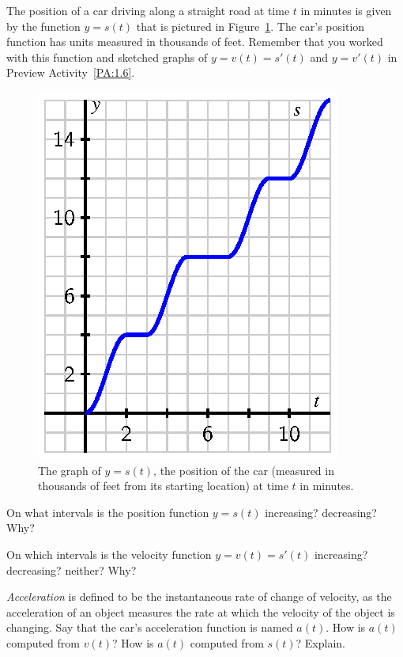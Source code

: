 \begin{activity} \label{A:1.6.1}
The position of a car driving along a straight road at time $t$ in minutes is given by the function $y = s(t)$ that is pictured in Figure~\ref{F:1.6.A1}.  The car's position function has units measured in thousands of feet.  Remember that you worked with this function and sketched graphs of $y = v(t) = s'(t)$ and $y = v'(t)$ in Preview Activity~\ref{PA:1.6}.
\begin{figure}[h]
\begin{center}
\includegraphics{figures/1_6_PA1.eps}
\caption{The graph of $y = s(t)$, the position of the car (measured in thousands of feet from its starting location) at time $t$ in minutes.} \label{F:1.6.A1}
\end{center}
\end{figure}
\ba
	\item On what intervals is the position function $y = s(t)$ increasing? decreasing?  Why?
	\item On which intervals is the velocity function $y = v(t) = s'(t)$ increasing? decreasing? neither?  Why?
	\item \emph{Acceleration}  is defined to be the instantaneous rate of change of velocity, as the acceleration of an object measures the rate at which the velocity of the object is changing.  Say that the car's acceleration function is named $a(t)$.  How is $a(t)$ computed from $v(t)$?  How is $a(t)$ computed from $s(t)$?  Explain.

\end{activity}
